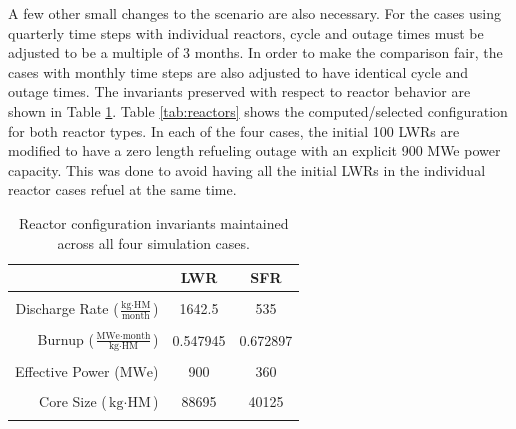 \documentclass{style}
\begin{document}
A few other small changes to the scenario are also necessary.  For the cases
using quarterly time steps with individual reactors, cycle and outage times
must be adjusted to be a multiple of 3 months.  In order to make the
comparison fair, the cases with monthly time steps are also adjusted to have
identical cycle and outage times.  The invariants preserved with respect to
reactor behavior are shown in Table \ref{tab:invar}.  Table
\ref{tab:reactors} shows the computed/selected configuration for both
reactor types.  In each of the four cases, the initial 100 LWRs are modified
to have a zero length refueling outage with an explicit 900 MWe power
capacity.  This was done to avoid having all the initial LWRs in the
individual reactor cases refuel at the same time.

\begin{table}
    \centering
    \begin{tabular}{ |r | c c | }
        \hline                       
                                                                             & LWR      & SFR      \\
        \hline                       
                                                                             &          &          \\
        Discharge Rate ($\frac{\text{kg} \cdot \text{HM}}{\text{month}}$)           & 1642.5   & 535      \\
                                                                             &          &          \\
        Burnup  ($\frac{\text{MWe} \cdot \text{month}}{\text{kg} \cdot \text{HM}}$) & 0.547945 & 0.672897 \\
                                                                             &          &          \\
        Effective Power  ($\text{MWe}$)                                      & 900      & 360      \\
                                                                             &          &          \\
        Core Size  ($\text{kg} \cdot \text{HM}$)                                    & 88695    & 40125    \\
                                                                             &          &          \\
        \hline                       
    \end{tabular}
    \captionsetup{justification=centering}
    \caption[Reactor parameter invariants]{
        Reactor configuration invariants maintained across all four
        simulation cases.
    }

    \label{tab:invar}
\end{table}
\end{document}
